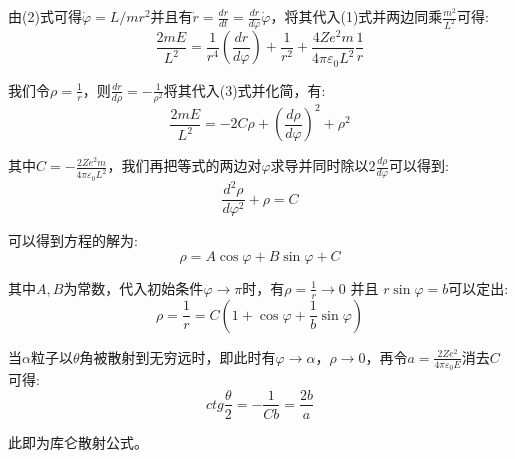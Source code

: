 \documentclass[utf8]{ctexart}
\begin{document}
由(2)式可得$\dot{\varphi} = L/mr^2$并且有$\dot{r} = \frac{dr}{dt} =  \frac{dr}{d\varphi}\dot{\varphi}$，将其代入(1)式并两边同乘$\frac{m^2}{L^2}$可得:
\begin{equation}
	\frac{2mE}{L^2}=\frac{1}{r^4}(\frac{dr}{d\varphi}) + \frac{1}{r^2} + \frac{4Ze^2m}{4\pi\varepsilon_0L^2}\frac{1}{r}
\end{equation}

我们令$\rho = \frac{1}{r}$，则$\frac{dr}{d\rho} = -\frac{1}{\rho^2}$将其代入(3)式并化简，有:
\begin{equation}
	\frac{2mE}{L^2} = -2C\rho+\left(\frac{d\rho}{d\varphi}\right)^2+\rho^2
\end{equation}

其中$C = -\frac{2Ze^2m}{4\pi\varepsilon_0L^2}$，我们再把等式的两边对$\varphi$求导并同时除以$2\frac{d\rho}{d\varphi}$可以得到:
\begin{equation}
	\frac{d^2\rho}{d\varphi^2}+\rho = C
\end{equation}

可以得到方程的解为:
\begin{equation}
	\rho = A\cos{\varphi} + B\sin{\varphi} + C
\end{equation}

其中$A,B$为常数，代入初始条件$\varphi \to \pi$时，有$\rho = \frac{1}{r} \to 0$ 并且 $r\sin{\varphi} = b$可以定出:
\begin{equation}
	\rho = \frac{1}{r} = C(1+\cos{\varphi} + \frac{1}{b}\sin{\varphi})
\end{equation}

当$\alpha$粒子以$\theta$角被散射到无穷远时，即此时有$\varphi \to \alpha$，$\rho \to 0$，再令$a = \frac{2Ze^2}{4\pi\varepsilon_0E}$消去$C$可得:
\begin{equation}
	ctg\frac{\theta}{2} = -\frac{1}{Cb} = \frac{2b}{a}
\end{equation}

此即为库仑散射公式。
\end{document}
